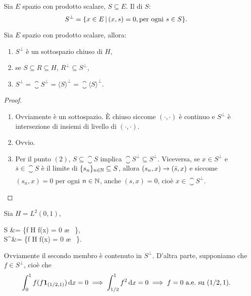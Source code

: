 \begin{definition}
	Sia $E$ spazio con prodotto scalare, $S \subseteq E$. Il  di $S$:
	\begin{equation*}
		S^\perp = \{ x \in E \,|\, (x,s) = 0, \text{per ogni $s \in S$} \}.
	\end{equation*}
\end{definition}

\begin{lemma}
\label{lemma:hilb_ort_comp}
	Sia $E$ spazio con prodotto scalare, allora:
	\begin{enumerate}
		\item $S^\perp$ è un sottospazio chiuso di $H$,
		\item se $S \subseteq R \subseteq H$, $R^\perp \subseteq S^\perp$,
		\item $S^\perp = \closure{S}^\perp = \langle S \rangle ^\perp = \closure{\langle S \rangle}^\perp$.
	\end{enumerate}
\end{lemma}
\begin{proof}
	\leavevmode
	\begin{enumerate}
		\item Ovviamente è un sottospazio. È chiuso siccome $(\cdot, \cdot)$ è continuo e $S^\perp$ è intersezione di insiemi di livello di $(\cdot, \cdot)$.
		\item Ovvio.
		\item Per il punto $(2)$, $S \subseteq \closure S$ implica $\closure{S}^\perp \subseteq S^\perp$. Viceversa, se $x \in S^\perp$ e $\bar s \in \closure S$ è il limite di $\{s_n\}_{n \in \mathbb{N}} \subseteq S$, allora $(s_n, x) \underset{{}}{\rightarrow} (\bar s,x)$ e siccome $(s_n,x) = 0$ per ogni $n \in \mathbb{N}$, anche $(s,x) = 0$, cioè $x \in \closure S^\perp$.
	\end{enumerate}
\end{proof}

\begin{example}
	Sia $H = L^2(0,1)$,
	\begin{eqalign*}
		S &= \{f \in H \suchthat f(x) = 0 \ae\  \},\\
		S^\perp &= \{f \in H \suchthat f(x) = 0 \ae\  \}.
	\end{eqalign*}
	Ovviamente il secondo membro è contenuto in $S^\perp$. D'altra parte, supponiamo che $f \in S^\perp$, cioè che
	\begin{equation*}
		\int_0^1 f (f {\boldsymbol{1}}_{(1/2,1)})\,\mathrm{d} x = 0 \implies \int_{1/2}^1 f^2\,\mathrm{d} x = 0 \implies f = 0 \ \text{a.e.}\ \text{su $(1/2,1)$}.
	\end{equation*}
\end{example}

